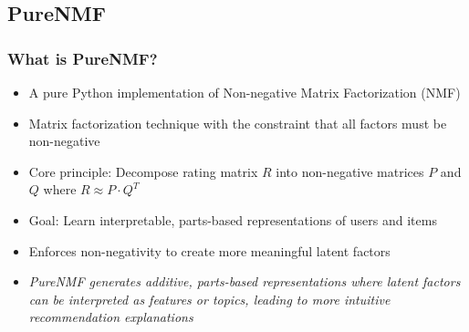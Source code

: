 \documentclass{beamer}
\begin{document}
\subsection{PureNMF}
\begin{frame}
\frametitle{What is PureNMF?}

\begin{itemize}
    \item A pure Python implementation of Non-negative Matrix Factorization (NMF)
    \item Matrix factorization technique with the constraint that all factors must be non-negative
    \item Core principle: Decompose rating matrix $R$ into non-negative matrices $P$ and $Q$ where $R \approx P \cdot Q^T$
    \item Goal: Learn interpretable, parts-based representations of users and items
    \item Enforces non-negativity to create more meaningful latent factors

    \vspace{1cm}

    \item \textit{PureNMF generates additive, parts-based representations where latent factors can be interpreted as features or topics, leading to more intuitive recommendation explanations}
\end{itemize}
\end{frame}
\end{document}
